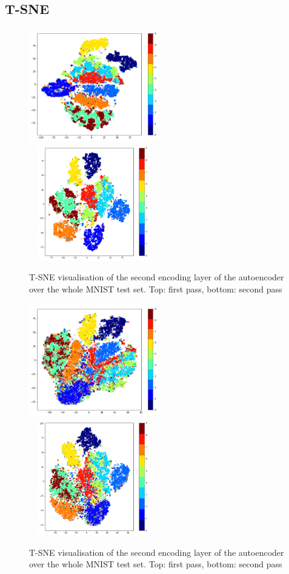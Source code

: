 \documentclass{article}
\begin{document}
\subsection{T-SNE} 
\begin{figure}[H]
      \centering
      \includegraphics[width=0.5\textwidth,height=5cm,keepaspectratio]{img/appendix/mnist_tsne/firstpass.png}
      \includegraphics[width=0.5\textwidth,height=5cm,keepaspectratio]{img/appendix/mnist_tsne/secondpass.png}
      \caption{T-SNE visualisation of the second encoding layer of the autoencoder over the whole MNIST test set. Top: first pass, bottom: second pass}
      \label{fig:tsne}
  \end{figure}
  
  \begin{figure}[H]
      \centering
      \includegraphics[width=0.5\textwidth,height=5cm,keepaspectratio]{img/appendix/mnist_tsne/noisefirstpass.png}
      \includegraphics[width=0.5\textwidth,height=5cm,keepaspectratio]{img/appendix/mnist_tsne/noisesecondpass.png}
      \caption{T-SNE visualisation of the second encoding layer of the autoencoder over the whole MNIST test set. Top: first pass, bottom: second pass}
      \label{fig:tsnenoise}
  \end{figure}
\end{document}
